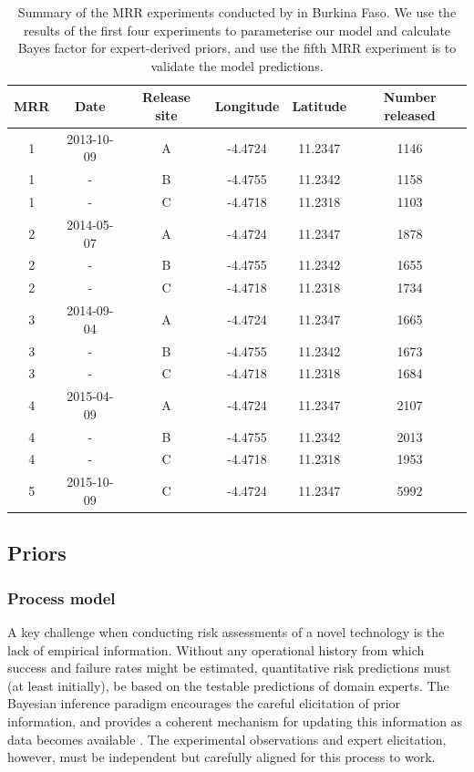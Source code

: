 \documentclass[]{bmcart}
\begin{document}
\begin{table}[ht]
\centering
\begingroup\small
\begin{tabular}{|cccccc|}
\hline
MRR & Date & Release site & Longitude & Latitude & Number released \\ 
\hline
1 & 2013-10-09 & A & -4.4724 & 11.2347 & 1146 \\ 
1 & - & B & -4.4755 & 11.2342 & 1158 \\ 
1 & - & C & -4.4718 & 11.2318 & 1103 \\ 
2 & 2014-05-07 & A & -4.4724 & 11.2347 & 1878 \\ 
2 & - & B & -4.4755 & 11.2342 & 1655 \\ 
2 & - & C & -4.4718 & 11.2318 & 1734 \\ 
3 & 2014-09-04 & A & -4.4724 & 11.2347 & 1665 \\ 
3 & - & B & -4.4755 & 11.2342 & 1673 \\ 
3 & - & C & -4.4718 & 11.2318 & 1684 \\ 
4 & 2015-04-09 & A & -4.4724 & 11.2347 & 2107 \\ 
4 & - & B & -4.4755 & 11.2342 & 2013 \\ 
4 & - & C & -4.4718 & 11.2318 & 1953 \\ 
5 & 2015-10-09 & C & -4.4724 & 11.2347 & 5992 \\ 
\hline
\end{tabular}
\endgroup
\caption{Summary of the MRR experiments conducted by \cite{Epopa2017} in Burkina Faso. We use the results of the first four experiments to parameterise our model and calculate Bayes factor for expert-derived priors, and use the fifth MRR experiment is to validate the model predictions.} 
\label{tab:relLoc}
\end{table}

\subsection{Priors}
\subsubsection{Process model}
A key challenge when conducting risk assessments of a novel technology is the lack of empirical information. Without any operational history from which success and failure rates might be estimated, quantitative risk predictions must (at least initially), be based on the testable predictions of domain experts. The Bayesian inference paradigm encourages the careful elicitation of prior information, and provides a coherent mechanism for updating this information as data becomes available \citep{Lindley2000}. The experimental observations and expert elicitation, however, must be independent but carefully aligned for this process to work.
\end{document}
